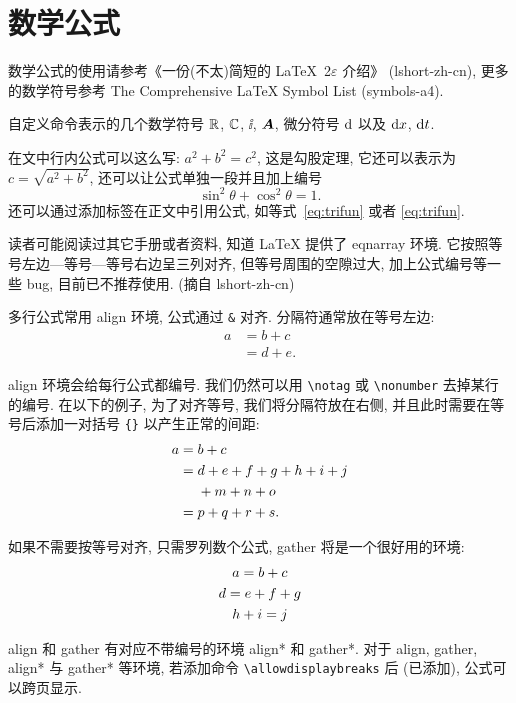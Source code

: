 \section{数学公式}\label{sec:mathEqEnv}

数学公式的使用请参考《一份(不太)简短的 \LaTeX~2$\varepsilon$ 介绍》 (lshort-zh-cn), 更多的数学符号参考 The Comprehensive LaTeX Symbol List (symbols-a4).

自定义命令表示的几个数学符号 $\RR$, $\CC$, $\ii$, $\bA$, 微分符号 $\dif$ 以及 $\dx$, $\dx[t]$.

在文中行内公式可以这么写: $a^2+b^2=c^2$, 这是勾股定理, 它还可以表示为 $c=\sqrt{a^2+b^2}$, 还可以让公式单独一段并且加上编号
\begin{equation}\label{eq:trifun}
\sin^2{\theta}+\cos^2{\theta}=1.
\end{equation}
还可以通过添加标签在正文中引用公式, 如等式~\eqref{eq:trifun} 或者 \ref{eq:trifun}.

读者可能阅读过其它手册或者资料, 知道 LaTeX 提供了 eqnarray 环境. 它按照等号左边—等号—等号右边呈三列对齐, 但等号周围的空隙过大, 加上公式编号等一些 bug, 目前已不推荐使用. (摘自 lshort-zh-cn)

多行公式常用 align 环境, 公式通过 \verb|&| 对齐. 分隔符通常放在等号左边:
\begin{align}
a & = b + c \\
& = d + e.
\end{align}

align 环境会给每行公式都编号. 我们仍然可以用 \verb|\notag| 或 \verb|\nonumber| 去掉某行的编号. 在以下的例子,
为了对齐等号, 我们将分隔符放在右侧, 并且此时需要在等号后添加一对括号 \verb|{}| 以产生正常的间距:
\begin{align}
a ={} & b + c \\
={} & d + e + f + g + h + i + j \notag \\
& + m + n + o \\
={} & p + q + r + s.
\end{align}

如果不需要按等号对齐, 只需罗列数个公式, gather 将是一个很好用的环境:
\begin{gather}
a = b + c \\
d = e + f + g \notag \\
h + i = j
\end{gather}

align 和 gather 有对应不带编号的环境 align* 和 gather*.
对于 align, gather, align* 与 gather* 等环境, 若添加命令 \verb|\allowdisplaybreaks| 后 (已添加), 公式可以跨页显示.

